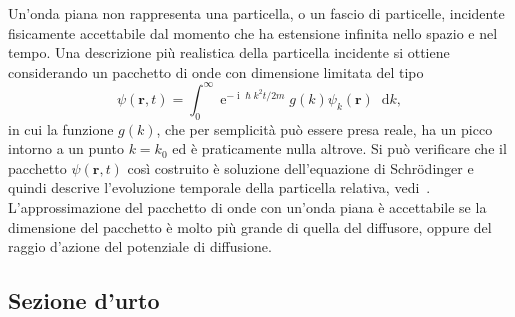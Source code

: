 \documentclass[a4paper,fleqn,twoside,12pt]{article}
\newcommand*{\dd}{\mathop{}\!\mathrm{d}} %
\DeclareMathOperator{\e}{\mathrm{e}} %
\DeclareMathOperator{\uimm}{\mathrm{i}} %
\begin{document}
Un'onda piana non rappresenta una particella, o un fascio di particelle,
incidente fisicamente accettabile dal momento che ha estensione infinita nello
spazio e nel tempo.  Una descrizione più realistica della particella incidente
si ottiene considerando un pacchetto di onde con dimensione limitata del tipo
\begin{equation}
  \psi(\bm{r},t) = \int_{0}^{\infty} \e^{-\uimm \hslash k^{2} t/2m} g(k)
  \psi_{k}(\bm{r}) \dd k,
\end{equation}
in cui la funzione $g(k)$, che per semplicità può essere presa reale, ha un
picco intorno a un punto $k = k_{0}$ ed è praticamente nulla altrove.  Si può
verificare che il pacchetto $\psi(\bm{r},t)$ così costruito è soluzione
dell'equazione di Schrödinger e quindi descrive l'evoluzione temporale della
particella relativa, vedi~\textcite[910-911]{cohen:quantum-mechanics}.
L'approssimazione del pacchetto di onde con un'onda piana è accettabile se la
dimensione del pacchetto è molto più grande di quella del diffusore, oppure del
raggio d'azione del potenziale di diffusione.

\subsection{Sezione d'urto}
\label{sec:sez-urto-mq}
\end{document}
